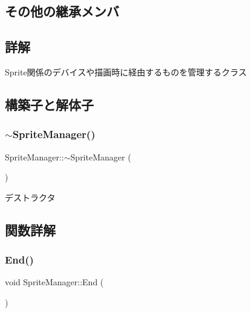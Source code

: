 \subsection*{その他の継承メンバ}


\subsection{詳解}
Sprite関係のデバイスや描画時に経由するものを管理するクラス 

\subsection{構築子と解体子}
\mbox{\label{class_sprite_manager_ae01a31b1c80f676604ba55c93b499e1f}} 
\subsubsection{\texorpdfstring{$\sim$\+Sprite\+Manager()}{~SpriteManager()}}
{\footnotesize\ttfamily Sprite\+Manager\+::$\sim$\+Sprite\+Manager (\begin{DoxyParamCaption}{ }\end{DoxyParamCaption})}



デストラクタ 



\subsection{関数詳解}
\mbox{\label{class_sprite_manager_afed8a96a6530f67123a4efa1b6d77032}} 
\subsubsection{\texorpdfstring{End()}{End()}}
{\footnotesize\ttfamily void Sprite\+Manager\+::\+End (\begin{DoxyParamCaption}{ }\end{DoxyParamCaption})\hspace{0.3cm}{\ttfamily [inline]}}



